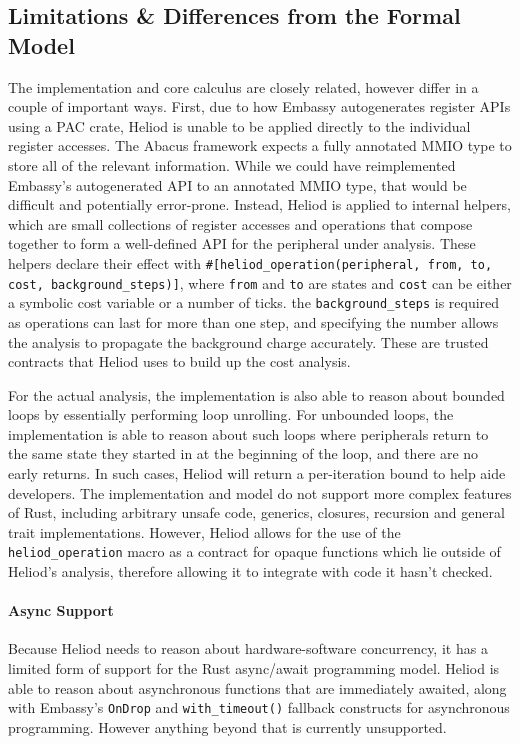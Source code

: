 \subsection{Limitations \& Differences from the Formal Model}
The implementation and core calculus are closely related, however differ in a couple of important ways. First, due to how Embassy autogenerates register APIs using a PAC crate, Heliod is unable to be applied directly to the individual register accesses. The Abacus framework expects a fully annotated MMIO type to store all of the relevant information. While we could have reimplemented Embassy's autogenerated API to an annotated MMIO type, that would be difficult and potentially error-prone. Instead, Heliod is applied to internal helpers, which are small collections of register accesses and operations that compose together to form a well-defined API for the peripheral under analysis. These helpers declare their effect with \texttt{\#[heliod\_operation(peripheral, from, to, cost, background\_steps)]}, where \texttt{from} and \texttt{to} are states and \texttt{cost} can be either a symbolic cost variable or a number of ticks. the \texttt{background\_steps} is required as operations can last for more than one step, and specifying the number allows the analysis to propagate the background charge accurately. These are trusted contracts that Heliod uses to build up the cost analysis. 

For the actual analysis, the implementation is also able to reason about bounded loops by essentially performing loop unrolling. For unbounded loops, the implementation is able to reason about such loops where peripherals return to the same state they started in at the beginning of the loop, and there are no early returns. In such cases, Heliod will return a per-iteration bound to help aide developers. The implementation and model do not support more complex features of Rust, including arbitrary unsafe code, generics, closures, recursion and general trait implementations. However, Heliod allows for the use of the \texttt{heliod\_operation} macro as a contract for opaque functions which lie outside of Heliod's analysis, therefore allowing it to integrate with code it hasn't checked. 

\paragraph{Async Support}
Because Heliod needs to reason about hardware-software concurrency, it has a limited form of support for the Rust async/await programming model. Heliod is able to reason about asynchronous functions that are immediately awaited, along with Embassy's \texttt{OnDrop} and \texttt{with\_timeout()} fallback constructs for asynchronous programming. However anything beyond that is currently unsupported.